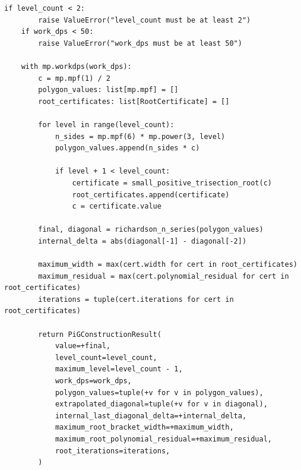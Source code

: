 \documentclass[11pt]{article}
\begin{document}
\begin{lstlisting}[style=pythonstyle,caption={\texttt{pi\_g\_construction.py}}]
    if level_count < 2:
        raise ValueError("level_count must be at least 2")
    if work_dps < 50:
        raise ValueError("work_dps must be at least 50")

    with mp.workdps(work_dps):
        c = mp.mpf(1) / 2
        polygon_values: list[mp.mpf] = []
        root_certificates: list[RootCertificate] = []

        for level in range(level_count):
            n_sides = mp.mpf(6) * mp.power(3, level)
            polygon_values.append(n_sides * c)

            if level + 1 < level_count:
                certificate = small_positive_trisection_root(c)
                root_certificates.append(certificate)
                c = certificate.value

        final, diagonal = richardson_n_series(polygon_values)
        internal_delta = abs(diagonal[-1] - diagonal[-2])

        maximum_width = max(cert.width for cert in root_certificates)
        maximum_residual = max(cert.polynomial_residual for cert in root_certificates)
        iterations = tuple(cert.iterations for cert in root_certificates)

        return PiGConstructionResult(
            value=+final,
            level_count=level_count,
            maximum_level=level_count - 1,
            work_dps=work_dps,
            polygon_values=tuple(+v for v in polygon_values),
            extrapolated_diagonal=tuple(+v for v in diagonal),
            internal_last_diagonal_delta=+internal_delta,
            maximum_root_bracket_width=+maximum_width,
            maximum_root_polynomial_residual=+maximum_residual,
            root_iterations=iterations,
        )
\end{lstlisting}
\end{document}

